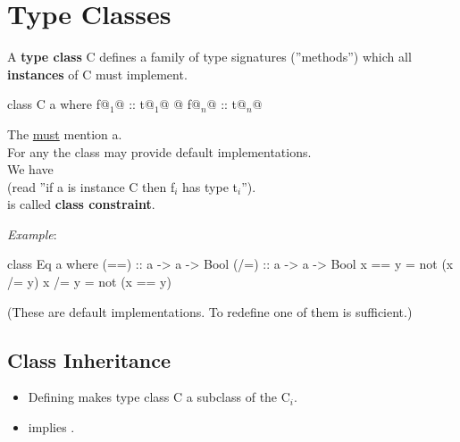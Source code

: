 

\section{Type Classes} %
\label{cha:type_classes}

A \textbf{type class} C defines a family of type signatures (''methods'') which all \textbf{instances} of C must implement.

\begin{Haskell}
class C a where
    f@$_1$@ :: t@$_1$@
    @\dots@
    f@$_n$@ :: t@$_n$@
\end{Haskell}

The  \underline{must} mention a.\\
For any  the class may provide default implementations. \\
We have  \\ (read ''if a is instance C then f$_i$ has type t$_i$'').\\
 is called \textbf{class constraint}.

\textit{Example}:

\begin{Haskell}
class Eq a where
    (==) :: a -> a -> Bool
    (/=) :: a -> a -> Bool
    x == y = not (x /= y)
    x /= y = not (x == y)
\end{Haskell}

(These are default implementations. To redefine one of them is sufficient.)



\subsection{Class Inheritance}

\begin{itemize}
    \item Defining  makes type class C a subclass of the C$_i$.
    \item {} implies .
\end{itemize}



